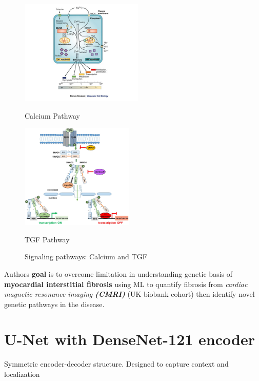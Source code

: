 \documentclass[../main.tex]{subfiles}
\begin{document}
\begin{figure}[h!]
    \begin{minipage}[t]{0.48\textwidth}
        \centering
        \includegraphics[width=\linewidth,height=5cm,keepaspectratio,valign=t]{files/images/calcium_path.jpg}
        \caption{Calcium Pathway \cite{Berridge2003}}
        \label{fig:calcium_path}
    \end{minipage}
    \hfill %
    \begin{minipage}[t]{0.48\textwidth}
        \centering
        \includegraphics[width=\linewidth,height=5cm,keepaspectratio,valign=t]{files/images/tgf_path.png}
        \caption{TGF Pathway \cite{cells8090960}}
        \label{fig:tgf_path}
    \end{minipage}
    \centering
    \caption{Signaling pathways: Calcium and TGF} %
    \label{fig:combined_pathways}
\end{figure}

\vspace{0.5cm}

Authors \textbf{goal} is to overcome limitation in understanding genetic basis of \textbf{myocardial interstitial fibrosis} using ML to quantify fibrosis from \textit{cardiac magnetic resonance imaging \textbf{(CMRI)}} (UK biobank cohort) then identify novel genetic pathways in the disease.

\section{U-Net with DenseNet-121 encoder}
Symmetric encoder-decoder structure. Designed to capture context and localization 
\end{document}
